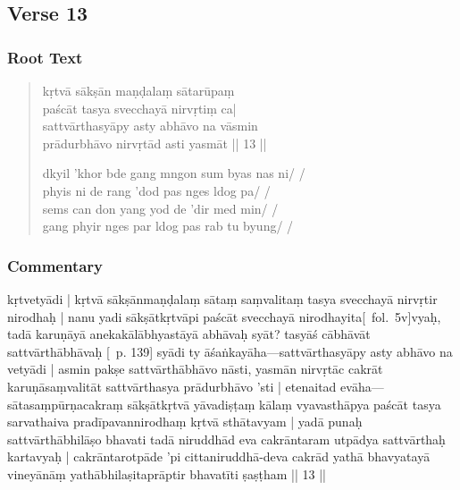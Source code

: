 \documentclass[12pt]{article}
\newcommand{\emdash} {\hspace{0em}—\hspace{0em}}
\begin{document}
\subsection{Verse 13}
\subsubsection{Root Text}
\begin{quote}
	kṛtvā sākṣān maṇḍalaṃ sātarūpaṃ \\
	paścāt tasya svecchayā nirvṛtiṃ\footnoteB{
		nirvṛtiṃ] \EDD ; nirvṛtiś \MS
	} ca|\\
	sattvārthasyāpy asty abhāvo na vāsmin \\
	prādurbhāvo nirvṛtād\footnoteB{
		nirvṛtād] \EDD ; nivṛtād \MS
	} asti yasmāt || 13 ||

	dkyil 'khor bde gang mngon sum byas nas ni/ /\\
	phyis ni de rang 'dod pas nges ldog pa/ /\\
	sems can don yang yod de 'dir med min/ /\\
	gang phyir nges par ldog pas rab tu byung/ /
\end{quote}

\subsubsection{Commentary}
kṛtvetyādi | kṛtvā sākṣānmaṇḍalaṃ sātaṃ saṃvalitaṃ tasya svecchayā nirvṛtir nirodhaḥ | nanu yadi sākṣātkṛtvāpi paścāt svecchayā nirodhayita[\MS\ fol.\ 5v]vyaḥ, tadā karuṇāyā anekakālābhyastāyā abhāvaḥ syāt? tasyāś cābhāvāt sattvārthābhāvaḥ [\EDD\ p. 139] syādi ty āśaṅkayāha\emdash sattvārthasyāpy asty abhāvo na vetyādi | asmin pakṣe sattvārthābhāvo nāsti, yasmān nirvṛtāc cakrāt karuṇāsaṃvalitāt sattvārthasya prādurbhāvo 'sti | etenaitad evāha\emdash sātasaṃpūrṇacakraṃ sākṣātkṛtvā yāvadiṣṭaṃ kālaṃ vyavasthāpya paścāt tasya sarvathaiva pradīpavannirodhaṃ kṛtvā sthātavyam | yadā punaḥ sattvārthābhilāṣo bhavati tadā niruddhād eva cakrāntaram utpādya sattvārthaḥ kartavyaḥ | cakrāntarotpāde 'pi cittaniruddhā-deva cakrād yathā bhavyatayā vineyānāṃ yathābhilaṣitaprāptir bhavatīti ṣaṣṭham || 13 ||\\
\end{document}
